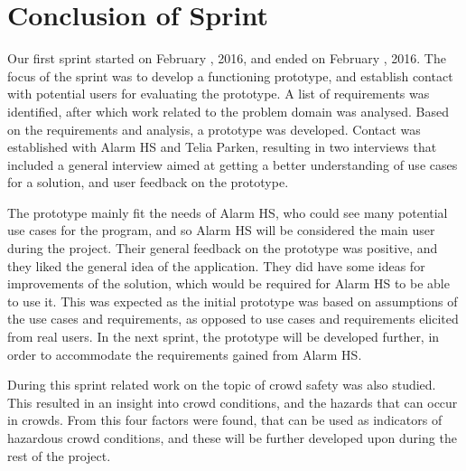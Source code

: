 \section{Conclusion of Sprint}
Our first sprint started on February , 2016, and ended on February , 2016. The focus of the sprint was to develop a functioning prototype, and establish contact with potential users for evaluating the prototype. A list of requirements was identified, after which work related to the problem domain was analysed. Based on the requirements and analysis, a prototype was developed. Contact was established with Alarm HS and Telia Parken, resulting in two interviews that included a general interview aimed at getting a better understanding of use cases for a solution, and user feedback on the prototype.

The prototype mainly fit the needs of Alarm HS, who could see many potential use cases for the program, and so Alarm HS will be considered the main user during the project. Their general feedback on the prototype was positive, and they liked the general idea of the application. They did have some ideas for improvements of the solution, which would be required for Alarm HS to be able to use it. This was expected as the initial prototype was based on assumptions of the use cases and requirements, as opposed to use cases and requirements elicited from real users. In the next sprint, the prototype will be developed further, in order to accommodate the requirements gained from Alarm HS.

During this sprint related work on the topic of crowd safety was also studied. This resulted in an insight into crowd conditions, and the hazards that can occur in crowds. From this four factors were found, that can be used as indicators of hazardous crowd conditions, and these will be further developed upon during the rest of the project.




